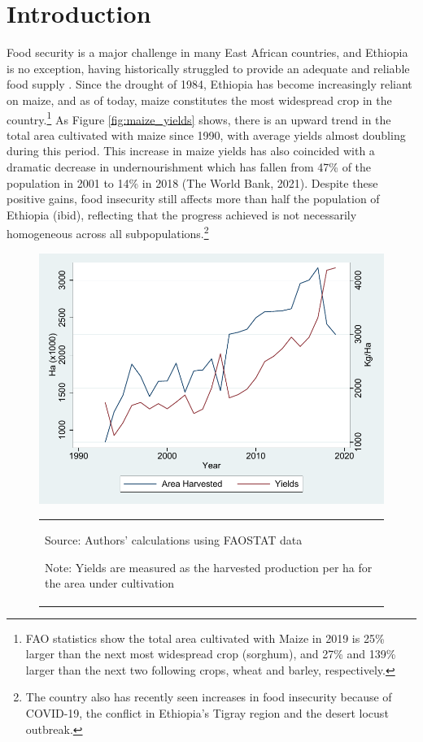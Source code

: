 \documentclass[11pt]{article}
\begin{document}
\section{Introduction}

Food security is a major challenge in many East African countries, and Ethiopia is no exception, having historically struggled to provide an adequate and reliable food supply \citep{Ramakrishna2002-hv, Jaleta2018-oj}. Since the drought of 1984, Ethiopia has become increasingly reliant on maize, and as of today, maize constitutes the most widespread crop in the country.\footnote{FAO statistics show the total area cultivated with Maize in 2019 is 25\% larger than the next most widespread crop (sorghum), and 27\% and 139\% larger than the next two following crops, wheat and barley, respectively.} As Figure \ref{fig:maize_yields} shows, there is an upward trend in the total area cultivated with maize since 1990, with average yields almost doubling during this period. This increase in maize yields has also coincided with a dramatic decrease in undernourishment which has fallen from 47\% of the population in 2001 to 14\% in 2018 (The World Bank, 2021). Despite these positive gains, food insecurity still affects more than half the population of Ethiopia (ibid), reflecting that the progress achieved 
is not necessarily homogeneous across all subpopulations.\footnote{The country also has recently seen increases in food insecurity because of COVID-19, the conflict in Ethiopia’s Tigray region and the desert locust outbreak.}

\begin{figure}[htp]
    \centering
    \caption{Maize: Total area harvested and average yields} \label{fig:maize_yields}
    \includegraphics[width=.6\textwidth]{results/figures/Maize_yields.pdf}
    \vspace*{-1em}
    \begin{table}[H]
        \centering
        \begin{tabular}{p{}} 
            \begin{tablenotes}[flushleft]
                  \small
                  \item Source: Authors' calculations using FAOSTAT data 
                  \item Note: Yields are measured as the harvested production per ha for the area under cultivation
            \end{tablenotes}
        \end{tabular}
    \end{table}       
\end{figure}
\end{document}
